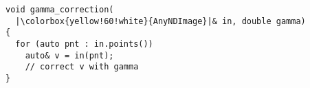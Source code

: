 \documentclass[varwidth=4.5cm,border={0.1cm 0.1cm 0.1cm 0.1cm}]{standalone}
\begin{document}
\begin{verbatim}
void gamma_correction(
  |\colorbox{yellow!60!white}{AnyNDImage}|& in, double gamma)
{
  for (auto pnt : in.points())
    auto& v = in(pnt);
    // correct v with gamma
}
\end{verbatim}
\end{document}

